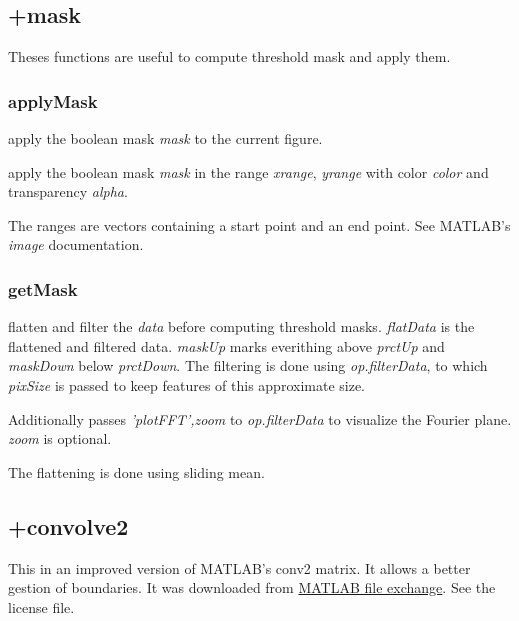 \subsection{+mask}
Theses functions are useful to compute threshold mask and apply them.
\subsubsection{applyMask}
\bdf
{} apply the boolean mask \emph{mask} to the current figure.

 apply the boolean mask \emph{mask} in the range \emph{xrange}, \emph{yrange} with color \emph{color} and transparency \emph{alpha}. 
\edf

The ranges are vectors containing a start point and an end point. See MATLAB's \emph{image} documentation.
\subsubsection{getMask}
\bdf
{}
 flatten and filter the \emph{data} before computing threshold masks. \emph{flatData} is the flattened and filtered data. \emph{maskUp} marks everithing above \emph{prctUp} and \emph{maskDown} below \emph{prctDown}. The filtering is done using \emph{op.filterData}, to which \emph{pixSize} is passed to keep features of this approximate size.

Additionally passes \emph{'plotFFT',zoom} to \emph{op.filterData} to visualize the Fourier plane. \emph{zoom} is optional.
\edf

The flattening is done using sliding mean.

\subsection{+convolve2}
This in an improved version of MATLAB's conv2 matrix. It allows a better gestion of boundaries. 
It was downloaded from \href{http://www.mathworks.com/matlabcentral/fileexchange/22619-fast-2-d-convolution}{MATLAB file exchange}. See the license file.

